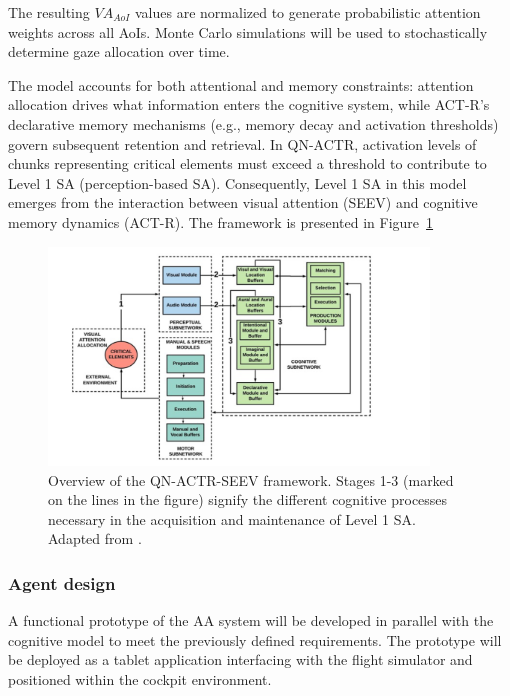 \documentclass[12pt,a4paper]{article} %
\begin{document}
	The resulting $VA_{AoI}$ values are normalized to generate probabilistic attention weights across all AoIs. Monte Carlo simulations will be used to stochastically determine gaze allocation over time.
	
	The model accounts for both attentional and memory constraints: attention allocation drives what information enters the cognitive system, while ACT-R's declarative memory mechanisms (e.g., memory decay and activation thresholds) govern subsequent retention and retrieval. In QN-ACTR, activation levels of chunks representing critical elements must exceed a threshold to contribute to Level 1 SA (perception-based SA). Consequently, Level 1 SA in this model emerges from the interaction between visual attention (SEEV) and cognitive memory dynamics (ACT-R). The framework is presented in Figure~\ref{fig:qn-actr-seev}

	\begin{figure}[H]
    \centering
    \includegraphics[width=0.9\textwidth]{./images/qn-actr-sa-synoptic.png}
    \caption{Overview of the QN-ACTR-SEEV framework. Stages 1-3 (marked on the lines in the figure) signify the different cognitive processes necessary in the acquisition and maintenance of Level 1 SA. Adapted from \textcite{rehman_phd_thesis}.}
    \label{fig:qn-actr-seev}
	\end{figure}

	\subsubsection{Agent design}
	A functional prototype of the AA system will be developed in parallel with the cognitive model to meet the previously defined requirements. The prototype will be deployed as a tablet application interfacing with the flight simulator and positioned within the cockpit environment.
\end{document}
